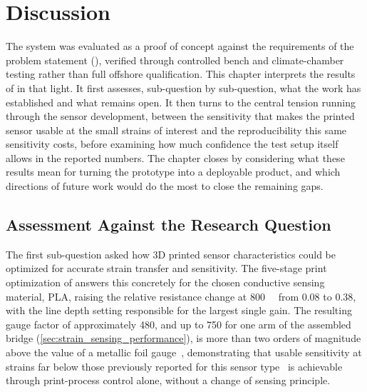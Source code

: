 \chapter{Discussion} \label{sec:Discussion}

The system was evaluated as a proof of concept against the requirements of the problem statement (), verified through controlled bench and climate-chamber testing rather than full offshore qualification. This chapter interprets the results of  in that light. It first assesses, sub-question by sub-question, what the work has established and what remains open. It then turns to the central tension running through the sensor development, between the sensitivity that makes the printed sensor usable at the small strains of interest and the reproducibility this same sensitivity costs, before examining how much confidence the test setup itself allows in the reported numbers. The chapter closes by considering what these results mean for turning the prototype into a deployable product, and which directions of future work would do the most to close the remaining gaps.

\section{Assessment Against the Research Question}
The first sub-question asked how 3D printed sensor characteristics could be optimized for accurate strain transfer and sensitivity. The five-stage print optimization of  answers this concretely for the chosen conductive sensing material, PLA, raising the relative resistance change at \SI{800}{\micro\strain} from \num{0.08} to \num{0.38}, with the line depth setting responsible for the largest single gain. The resulting gauge factor of approximately \num{480}, and up to \num{750} for one arm of the assembled bridge (\cref{sec:strain_sensing_performance}), is more than two orders of magnitude above the value of a metallic foil gauge~\cite{metal_gauge}, demonstrating that usable sensitivity at strains far below those previously reported for this sensor type~\cite{G.O.A.T} is achievable through print-process control alone, without a change of sensing principle.


